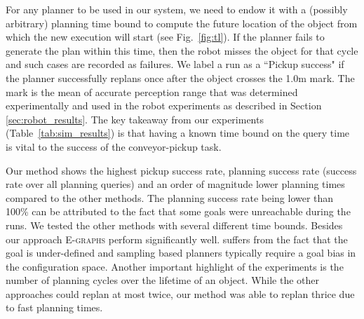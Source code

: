 \documentclass[a4paper]{report}
\begin{document}
For any planner to be used in our system, we need to endow it with a (possibly arbitrary) planning time bound to compute the future location of the object from which the new execution will start (see Fig.~\ref{fig:tl}). 
%
If the planner fails to generate the plan within this time, then the robot misses the object for that cycle and such cases are recorded as failures. 
%
We label a run as a ``Pickup success" if the planner successfully replans once after the object crosses the 1.0m mark. The mark is the mean of accurate perception range that was determined experimentally and used in the robot experiments as described in Section \ref{sec:robot_results}.
%
The key takeaway from our experiments (Table~\ref{tab:sim_results}) is that having a known time bound on the query time is vital to the success of the conveyor-pickup task.

Our method shows the highest pickup success rate, planning success rate (success rate over all planning queries) and an order of magnitude lower planning times compared to the other methods. 
The planning success rate being lower than 100\% can be attributed to the fact that some goals were unreachable during the runs. 
%
We tested the other methods with several different time bounds. Besides our approach \textsc{E-graphs} perform significantly well. \rrt suffers from the fact that the goal is under-defined and sampling based planners typically require a goal bias in the configuration space. Another important highlight of the experiments is the number of planning cycles over the lifetime of an object. While the other approaches could replan at most twice, our method was able to replan thrice due to fast planning times.
\end{document}
